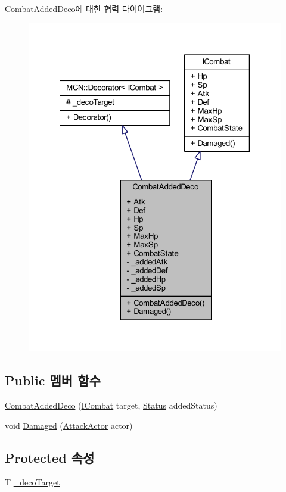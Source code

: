 Combat\+Added\+Deco에 대한 협력 다이어그램\+:
\nopagebreak
\begin{figure}[H]
\begin{center}
\leavevmode
\includegraphics[width=322pt]{class_combat_added_deco__coll__graph}
\end{center}
\end{figure}
\subsection*{Public 멤버 함수}
\begin{DoxyCompactItemize}
\item 
\hyperlink{class_combat_added_deco_a18e349f5ae6041f6b2d1d1844b59987a}{Combat\+Added\+Deco} (\hyperlink{interface_i_combat}{I\+Combat} target, \hyperlink{struct_status}{Status} added\+Status)
\item 
void \hyperlink{class_combat_added_deco_a3f1bc69d50b10571339d651eaa093a43}{Damaged} (\hyperlink{class_attack_actor}{Attack\+Actor} actor)
\end{DoxyCompactItemize}
\subsection*{Protected 속성}
\begin{DoxyCompactItemize}
\item 
T \hyperlink{class_m_c_n_1_1_decorator_a358dba6e4ac8d5ef06ed9f5592f8827e}{\+\_\+deco\+Target}
\end{DoxyCompactItemize}
